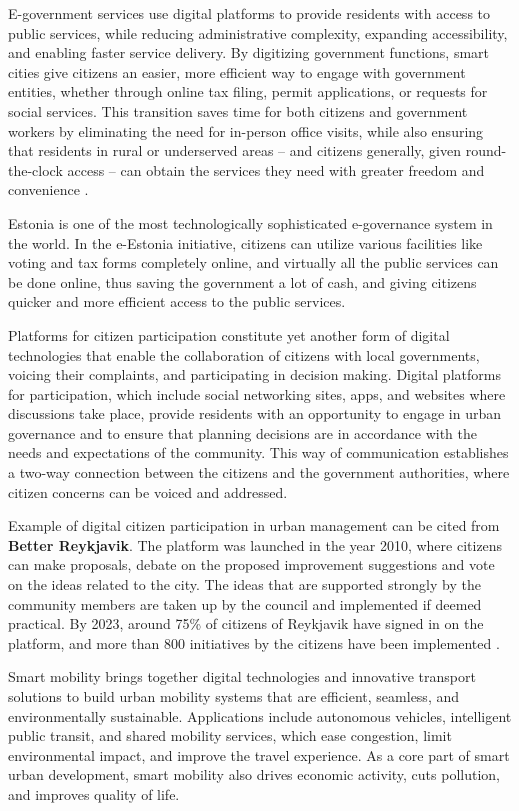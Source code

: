 \documentclass[pdflatex,sn-mathphys-num]{sn-jnl}%
\theoremstyle{thmstyleone}%
\theoremstyle{thmstyletwo}%
\theoremstyle{thmstylethree}%
\begin{document}
E-government services use digital platforms to provide residents with access to public services, while reducing administrative complexity, expanding accessibility, and enabling faster service delivery. By digitizing government functions, smart cities give citizens an easier, more efficient way to engage with government entities, whether through online tax filing, permit applications, or requests for social services. This transition saves time for both citizens and government workers by eliminating the need for in-person office visits, while also ensuring that residents in rural or underserved areas -- and citizens generally, given round-the-clock access -- can obtain the services they need with greater freedom and convenience \cite{r73,r100}.

Estonia is one of the most technologically sophisticated e-governance system in the world. In the e-Estonia initiative, citizens can utilize various facilities like voting and tax forms completely online, and virtually all the public services can be done online, thus saving the government a lot of cash, and giving citizens quicker and more efficient access to the public services.

Platforms for citizen participation constitute yet another form of digital technologies that enable the collaboration of citizens with local governments, voicing their complaints, and participating in decision making. Digital platforms for participation, which include social networking sites, apps, and websites where discussions take place, provide residents with an opportunity to engage in urban governance and to ensure that planning decisions are in accordance with the needs and expectations of the community. This way of communication establishes a two-way connection between the citizens and the government authorities, where citizen concerns can be voiced and addressed.

Example of digital citizen participation in urban management can be cited from \textbf{Better Reykjavik}. The platform was launched in the year 2010, where citizens can make proposals, debate on the proposed improvement suggestions and vote on the ideas related to the city. The ideas that are supported strongly by the community members are taken up by the council and implemented if deemed practical. By 2023, around 75\% of citizens of Reykjavik have signed in on the platform, and more than 800 initiatives by the citizens have been implemented \cite{r75,r102}.

Smart mobility brings together digital technologies and innovative transport solutions to build urban mobility systems that are efficient, seamless, and environmentally sustainable. Applications include autonomous vehicles, intelligent public transit, and shared mobility services, which ease congestion, limit environmental impact, and improve the travel experience. As a core part of smart urban development, smart mobility also drives economic activity, cuts pollution, and improves quality of life.
\end{document}
